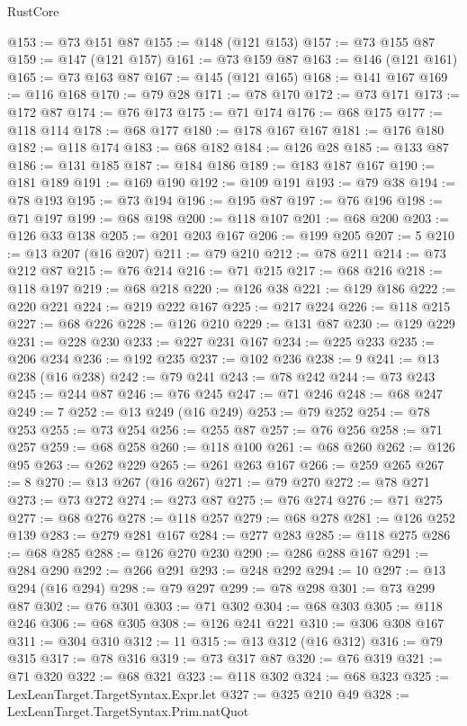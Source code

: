 \begin{lexlean}{RustCore}
\begin{coremodule}
@153 := @73 @151 @87
@155 := @148 (@121 @153)
@157 := @73 @155 @87
@159 := @147 (@121 @157)
@161 := @73 @159 @87
@163 := @146 (@121 @161)
@165 := @73 @163 @87
@167 := @145 (@121 @165)
@168 := @141 @167
@169 := @116 @168
@170 := @79 @28
@171 := @78 @170
@172 := @73 @171
@173 := @172 @87
@174 := @76 @173
@175 := @71 @174
@176 := @68 @175
@177 := @118 @114
@178 := @68 @177
@180 := @178 @167 @167
@181 := @176 @180
@182 := @118 @174
@183 := @68 @182
@184 := @126 @28
@185 := @133 @87
@186 := @131 @185
@187 := @184 @186
@189 := @183 @187 @167
@190 := @181 @189
@191 := @169 @190
@192 := @109 @191
@193 := @79 @38
@194 := @78 @193
@195 := @73 @194
@196 := @195 @87
@197 := @76 @196
@198 := @71 @197
@199 := @68 @198
@200 := @118 @107
@201 := @68 @200
@203 := @126 @33 @138
@205 := @201 @203 @167
@206 := @199 @205
@207 := 5
@210 := @13 @207 (@16 @207)
@211 := @79 @210
@212 := @78 @211
@214 := @73 @212 @87
@215 := @76 @214
@216 := @71 @215
@217 := @68 @216
@218 := @118 @197
@219 := @68 @218
@220 := @126 @38
@221 := @129 @186
@222 := @220 @221
@224 := @219 @222 @167
@225 := @217 @224
@226 := @118 @215
@227 := @68 @226
@228 := @126 @210
@229 := @131 @87
@230 := @129 @229
@231 := @228 @230
@233 := @227 @231 @167
@234 := @225 @233
@235 := @206 @234
@236 := @192 @235
@237 := @102 @236
@238 := 9
@241 := @13 @238 (@16 @238)
@242 := @79 @241
@243 := @78 @242
@244 := @73 @243
@245 := @244 @87
@246 := @76 @245
@247 := @71 @246
@248 := @68 @247
@249 := 7
@252 := @13 @249 (@16 @249)
@253 := @79 @252
@254 := @78 @253
@255 := @73 @254
@256 := @255 @87
@257 := @76 @256
@258 := @71 @257
@259 := @68 @258
@260 := @118 @100
@261 := @68 @260
@262 := @126 @95
@263 := @262 @229
@265 := @261 @263 @167
@266 := @259 @265
@267 := 8
@270 := @13 @267 (@16 @267)
@271 := @79 @270
@272 := @78 @271
@273 := @73 @272
@274 := @273 @87
@275 := @76 @274
@276 := @71 @275
@277 := @68 @276
@278 := @118 @257
@279 := @68 @278
@281 := @126 @252 @139
@283 := @279 @281 @167
@284 := @277 @283
@285 := @118 @275
@286 := @68 @285
@288 := @126 @270 @230
@290 := @286 @288 @167
@291 := @284 @290
@292 := @266 @291
@293 := @248 @292
@294 := 10
@297 := @13 @294 (@16 @294)
@298 := @79 @297
@299 := @78 @298
@301 := @73 @299 @87
@302 := @76 @301
@303 := @71 @302
@304 := @68 @303
@305 := @118 @246
@306 := @68 @305
@308 := @126 @241 @221
@310 := @306 @308 @167
@311 := @304 @310
@312 := 11
@315 := @13 @312 (@16 @312)
@316 := @79 @315
@317 := @78 @316
@319 := @73 @317 @87
@320 := @76 @319
@321 := @71 @320
@322 := @68 @321
@323 := @118 @302
@324 := @68 @323
@325 := LexLeanTarget.TargetSyntax.Expr.let
@327 := @325 @210 @49
@328 := LexLeanTarget.TargetSyntax.Prim.natQuot

\end{coremodule}
\end{lexlean}
